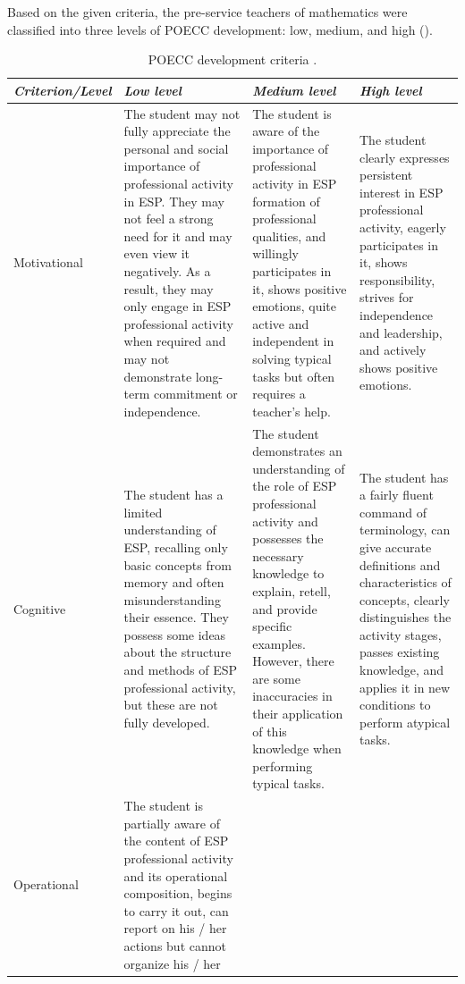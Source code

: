 Based on the given criteria, the pre-service teachers of mathematics were classified into three levels of POECC development: low, medium, and high ().

	\begin{table}[!htpb]
	\centering
	\caption{POECC development criteria \cite{dmitrenko2020autonomous}.}
	\label{tab-02}
	\begin{threeparttable}
    \begin{tabular}{ l p{4cm} p{4cm} p{4cm}}
    \toprule
	\emph{Criterion/Level} & \emph{Low level} & \emph{Medium level} & \emph{High level} \\
	\midrule
	Motivational & The student may not fully appreciate the personal and
				social importance of professional activity in ESP. They may not feel a
				strong need for it and may even view it negatively. As a result, they
				may only engage in ESP professional activity when required and may not
				demonstrate long-term commitment or independence. & The student is aware
				of the importance of professional activity in ESP formation of
				professional qualities, and willingly participates in it, shows positive
				emotions, quite active and independent in solving typical tasks but
				often requires a teacher's help. & The student clearly expresses
				persistent interest in ESP professional activity, eagerly 
				participates in it, shows responsibility, strives for independence and
				leadership, and actively shows positive emotions. \\
				Cognitive & The student has a limited understanding of ESP, recalling
				only basic concepts from memory and often misunderstanding their
				essence. They possess some ideas about the structure and methods of ESP
				professional activity, but these are not fully developed. & The student
				demonstrates an understanding of the role of ESP professional activity
				and possesses the necessary knowledge to explain, retell, and provide
				specific examples. However, there are some inaccuracies in their
				application of this knowledge when performing typical tasks. & The
				student has a fairly fluent command of terminology, can give accurate
				definitions and characteristics of concepts, clearly distinguishes the
				activity stages, passes existing knowledge, and applies it in new
				conditions to perform atypical tasks. \\
				Operational & The student is partially aware of the content of ESP
				professional activity and its operational composition, begins to carry
				it out, can report on his / her actions but cannot organize his / her

\end{tabular}
\end{threeparttable}
\end{table}
